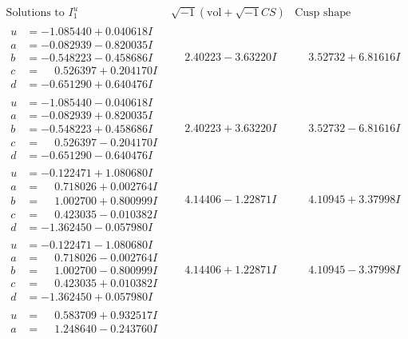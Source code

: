 \documentclass[1p]{elsarticle_modified}
\theoremstyle{definition}
\newcommand{\I}{\sqrt{-1}}
\begin{document}
$$\begin{array}{c|c|c}  
\text{Solutions to }I^u_{1}& \I (\text{vol} + \sqrt{-1}CS) & \text{Cusp shape}\\
 \hline 
\begin{aligned}
u &= -1.085440 + 0.040618 I \\
a &= -0.082939 - 0.820035 I \\
b &= -0.548223 - 0.458686 I \\
c &= \phantom{-}0.526397 + 0.204170 I \\
d &= -0.651290 + 0.640476 I\end{aligned}
 & \phantom{-}2.40223 - 3.63220 I & \phantom{-}3.52732 + 6.81616 I \\ \hline\begin{aligned}
u &= -1.085440 - 0.040618 I \\
a &= -0.082939 + 0.820035 I \\
b &= -0.548223 + 0.458686 I \\
c &= \phantom{-}0.526397 - 0.204170 I \\
d &= -0.651290 - 0.640476 I\end{aligned}
 & \phantom{-}2.40223 + 3.63220 I & \phantom{-}3.52732 - 6.81616 I \\ \hline\begin{aligned}
u &= -0.122471 + 1.080680 I \\
a &= \phantom{-}0.718026 + 0.002764 I \\
b &= \phantom{-}1.002700 + 0.800999 I \\
c &= \phantom{-}0.423035 - 0.010382 I \\
d &= -1.362450 - 0.057980 I\end{aligned}
 & \phantom{-}4.14406 - 1.22871 I & \phantom{-}4.10945 + 3.37998 I \\ \hline\begin{aligned}
u &= -0.122471 - 1.080680 I \\
a &= \phantom{-}0.718026 - 0.002764 I \\
b &= \phantom{-}1.002700 - 0.800999 I \\
c &= \phantom{-}0.423035 + 0.010382 I \\
d &= -1.362450 + 0.057980 I\end{aligned}
 & \phantom{-}4.14406 + 1.22871 I & \phantom{-}4.10945 - 3.37998 I \\ \hline\begin{aligned}
u &= \phantom{-}0.583709 + 0.932517 I \\
a &= \phantom{-}1.248640 - 0.243760 I \\

\end{aligned}
\end{array}$$
\end{document}
